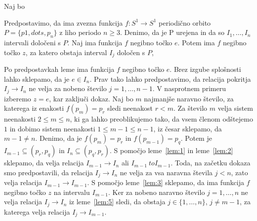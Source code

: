 \documentclass[../TG_magistrsko_delo_sections.tex]{subfiles}
\begin{document}
\begin{dokaz}
Naj bo
\end{dokaz}

\begin{lema}\label{lem:6}				%
Predpostavimo, da ima zvezna funkcija $f : S^1 \to S^1$ periodično orbito $P = \{p1, dots, p_n\}$ z liho periodo $n \geq 3$. Denimo, da je P urejena in da so $I_1, \dots, I_n$ intervali določeni s $P$. Naj ima funkcija $f$ negibno točko $e$. Potem ima $f$ negibno točko $z$, za katero obstaja interval $I_j$ določen s $P$, 
\end{lema}

\begin{dokaz}
Po predpostavkah leme ima funkcija $f$ negibno točko $e$. Brez izgube splošnosti lahko sklepamo, da je $e \in I_n$. Prav tako lahko predpostavimo, da relacija pokritja $I_j \to I_n$ ne velja za nobeno število $j = 1, \dots, n-1$. V nasprotnem primeru izberemo $z=e$, kar zaključi dokaz.
Naj bo $m$ najmanjše naravno število, za katerega iz enakosti $f(p_m) = p_r$ sledi neenakost $r < m$. Za število $m$ velja sistem neenakosti $2 \leq m \leq n$, ki ga lahko preoblikujemo tako, da vsem členom odštejemo $1$ in dobimo sistem neenakosti $1 \leq m -1 \leq n-1$, iz česar sklepamo, da $m-1 \neq n$. Denimo, da je $f(p_m) = p_r$ in $f(p_{m-1}) = p_q$. Potem je $I_{m-1} \subseteq (p_r, p_q)$ in $I_n \subseteq (p_q, p_r)$. S pomočjo leme~\ref{lem:1} in leme~\ref{lem:2} sklepamo, da velja relacija $I_{m-1} \to I_n$ ali $I_{m-1} \ to I_{m-1}$. Toda, na začetku dokaza smo predpostavili, da relacija $I_{j} \to I_n$ ne velja za vsa naravna števila $j < n$, zato velja relacija $I_{m-1} \to I_{m-1}$. S pomočjo leme~\ref{lem:3} sklepamo, da ima funkcija $f$ negibno točko $z$ na intervalu $I_{m-1}$. Ker za nobeno naravno število $j = 1, \dots, n$ ne velja relacija $I_j \to I_n$ iz leme~\ref{lem:5} sledi, da obstaja $j \in \{1, \dots, n\}$, $j \neq m-1$, za katerega velja relacija $I_j \to I_{m-1}$.

\end{dokaz}
\end{document}
